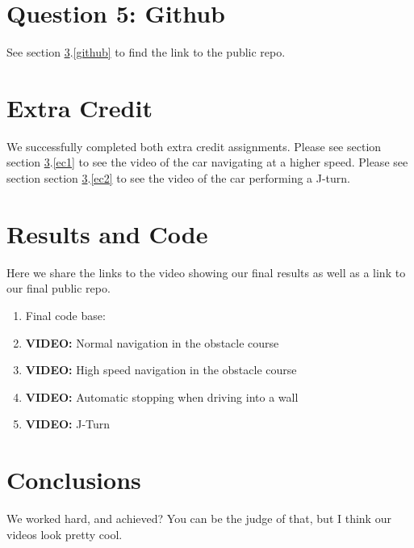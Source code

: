 \documentclass[12pt]{article}
\begin{document}
\maketitle











\section{Question 5: Github}

See section \ref{results}.\ref{github} to find the link to the public repo. 



\section{Extra Credit} 

We successfully completed both extra credit assignments. Please see section section \ref{results}.\ref{ec1} to see the video of the car navigating at a higher speed. Please see section section \ref{results}.\ref{ec2} to see the video of the car performing a J-turn. 

\section{Results and Code}\label{results}
Here we share the links to the video showing our final results as well as a link to our final public repo. 

\begin{enumerate}
	\item\label{github} Final code base: 
	\item \textbf{VIDEO:} Normal navigation in the obstacle course 
	\item\label{ec1} \textbf{VIDEO:} High speed navigation in the obstacle course
	\item \textbf{VIDEO:} Automatic stopping when driving into a wall
	\item\label{ec2} \textbf{VIDEO:} J-Turn
\end{enumerate}

\section{Conclusions}\label{conclusions}
We worked hard, and achieved? You can be the judge of that, but I think our videos look pretty cool. 
\end{document}
